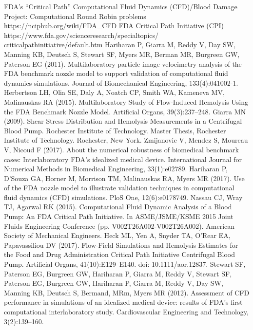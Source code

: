  FDA’s ``Critical Path'' Computational Fluid Dynamics (CFD)/Blood Damage Project: Computational Round Robin problems
https://nciphub.org/wiki/FDA\_CFD
 FDA Critical Path Initiative (CPI) \\https://www.fda.gov/scienceresearch/specialtopics/\\criticalpathinitiative/default.htm
 Hariharan P, Giarra M, Reddy V, Day SW, Manning KB, Deutsch S, Stewart SF, Myers MR, Berman MR, Burgreen GW, Paterson EG (2011). Multilaboratory particle image velocimetry analysis of the FDA benchmark nozzle model to support validation of computational fluid dynamics simulations. Journal of Biomechanical Engineering, 133(4):041002-1.
 Herbertson LH, Olia SE, Daly A, Noatch CP, Smith WA, Kameneva MV, Malinauskas RA (2015). Multilaboratory Study of Flow-Induced Hemolysis Using the FDA Benchmark Nozzle Model. Artificial Organs, 39(3):237--248.
 Giarra MN (2009). Shear Stress Distribution and Hemolysis Measurements in a Centrifugal Blood Pump. Rochester Institute of Technology. Master Thesis, Rochester Institute of Technology. Rochester, New York.
 Zmijanovic V, Mendez S, Moureau V, Nicoud F (2017). About the numerical robustness of biomedical benchmark cases: Interlaboratory FDA's idealized medical device. International Journal for Numerical Methods in Biomedical Engineering, 33(1):e02789.
 Hariharan P, D'Souza GA, Horner M, Morrison TM, Malinauskas RA, Myers MR (2017). Use of the FDA nozzle model to illustrate validation techniques in computational fluid dynamics (CFD) simulations. PloS One, 12(6):e0178749.
 Nassau CJ, Wray TJ, Agarwal RK (2015). Computational Fluid Dynamic Analysis of a Blood Pump: An FDA Critical Path Initiative. In ASME/JSME/KSME 2015 Joint Fluids Engineering Conference (pp. V002T26A002-V002T26A002). American Society of Mechanical Engineers.
 Heck ML, Yen A, Snyder TA, O'Rear EA, Papavassiliou DV (2017). Flow-Field Simulations and Hemolysis Estimates for the Food and Drug Administration Critical Path Initiative Centrifugal Blood Pump. Artificial Organs, 41(10):E129--E140. doi: 10.1111/aor.12837.
 Stewart SF, Paterson EG, Burgreen GW, Hariharan P, Giarra M, Reddy V, Stewart SF, Paterson EG, Burgreen GW, Hariharan P, Giarra M, Reddy V, Day SW, Manning KB, Deutsch S, Bermand, MRm, Myers MR (2012). Assessment of CFD performance in simulations of an idealized medical device: results of FDA's first computational interlaboratory study. Cardiovascular Engineering and Technology, 3(2):139--160.
